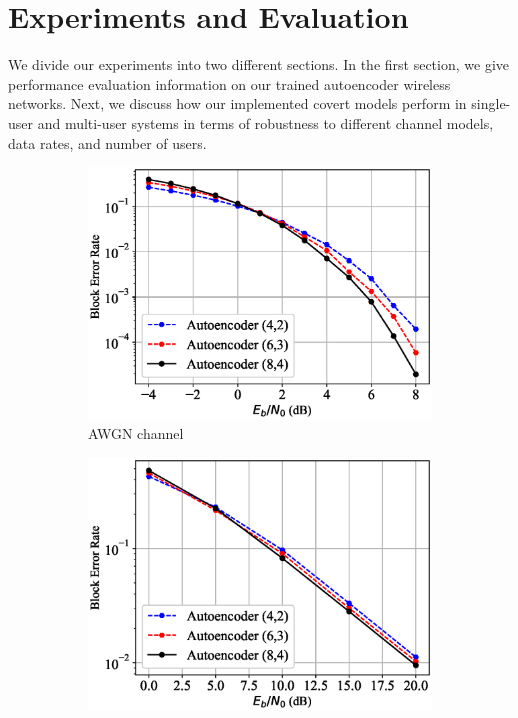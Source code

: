 \section{Experiments and Evaluation}
\label{s:eval}
We divide our experiments into two different sections. In the first section, we give performance evaluation information on our trained autoencoder wireless networks. Next, we discuss how our implemented covert models perform in single-user and multi-user systems in terms of robustness to different channel models, data rates, and number of users.

\begin{figure}[!tp]
	\center
	\begin{subfigure}{0.3\textwidth}
		\includegraphics[width=\linewidth]{figs/autoencoder_bler_awgn}
		\caption{AWGN channel}
	\end{subfigure}
	\begin{subfigure}{0.3\textwidth}
		\includegraphics[width=\linewidth]{figs/autoencoder_bler_rayleigh}

\end{subfigure}
\end{figure}
